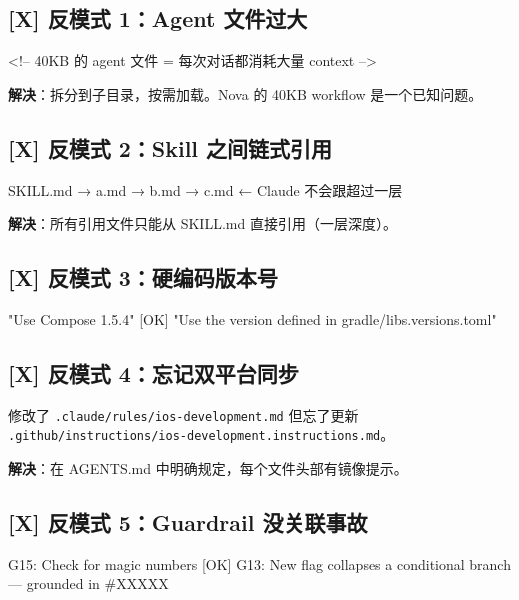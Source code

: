 \subsection{[X] 反模式 1：Agent 文件过大}

\begin{codeblock}
<!-- 40KB 的 agent 文件 = 每次对话都消耗大量 context -->
\end{codeblock}

\textbf{解决}：拆分到子目录，按需加载。Nova 的 40KB workflow 是一个已知问题。


\subsection{[X] 反模式 2：Skill 之间链式引用}

\begin{codeblock}
SKILL.md → a.md → b.md → c.md    ← Claude 不会跟超过一层
\end{codeblock}

\textbf{解决}：所有引用文件只能从 SKILL.md 直接引用（一层深度）。


\subsection{[X] 反模式 3：硬编码版本号}

\begin{codeblock}
[X] "Use Compose 1.5.4"
[OK] "Use the version defined in gradle/libs.versions.toml"
\end{codeblock}

\subsection{[X] 反模式 4：忘记双平台同步}

修改了 \texttt{.claude/rules/ios-development.md} 但忘了更新 \texttt{.github/instructions/ios-development.instructions.md}。


\textbf{解决}：在 AGENTS.md 中明确规定，每个文件头部有镜像提示。


\subsection{[X] 反模式 5：Guardrail 没关联事故}

\begin{codeblock}
[X] G15: Check for magic numbers
[OK] G13: New flag collapses a conditional branch --- grounded in #XXXXX
\end{codeblock}

